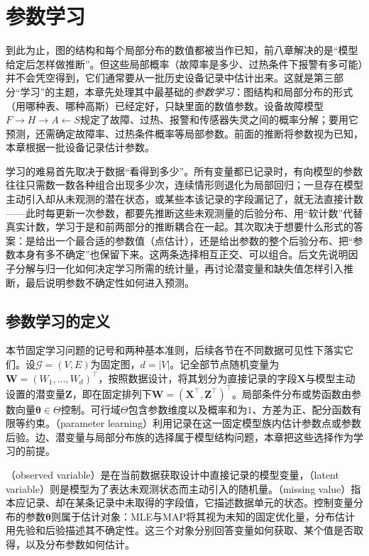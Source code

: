 \chapter{参数学习}
\label{chap:pgm-parameter-learning}

到此为止，图的结构和每个局部分布的数值都被当作已知，前八章解决的是“模型给定后怎样做推断”。但这些局部概率（故障率是多少、过热条件下报警有多可能）并不会凭空得到，它们通常要从一批历史设备记录中估计出来。这就是第三部分“学习”的主题，本章先处理其中最基础的\emph{参数学习}：图结构和局部分布的形式（用哪种表、哪种高斯）已经定好，只缺里面的数值参数。设备故障模型$F\to H\to A\leftarrow S$规定了故障、过热、报警和传感器失灵之间的概率分解；要用它预测，还需确定故障率、过热条件概率等局部参数。前面的推断将参数视为已知，本章根据一批设备记录估计参数。

学习的难易首先取决于数据“看得到多少”。所有变量都已记录时，有向模型的参数往往只需数一数各种组合出现多少次，连续情形则退化为局部回归；一旦存在模型主动引入却从未观测的潜在状态，或某些本该记录的字段漏记了，就无法直接计数——此时每更新一次参数，都要先推断这些未观测量的后验分布、用“软计数”代替真实计数，学习于是和前两部分的推断耦合在一起。其次取决于想要什么形式的答案：是给出一个最合适的参数值（点估计），还是给出参数的整个后验分布、把“参数本身有多不确定”也保留下来。这两条选择相互正交、可以组合。后文先说明因子分解与归一化如何决定学习所需的统计量，再讨论潜变量和缺失值怎样引入推断，最后说明参数不确定性如何进入预测。

\section{参数学习的定义}
\label{sec:pgm-parameter-learning-definition}

本节固定学习问题的记号和两种基本准则，后续各节在不同数据可见性下落实它们。设$\mathcal{G}=(V,E)$为固定图，$d=|V|$。记全部节点随机变量为$\bm{W}=(W_1,\ldots,W_d)^\top$，按照数据设计，将其划分为直接记录的字段$\bm{X}$与模型主动设置的潜变量$\bm{Z}$，即在固定排列下$\bm{W}=(\bm{X}^\top,\bm{Z}^\top)^\top$。局部条件分布或势函数由参数向量$\bm{\theta}\in\Theta$控制。可行域$\Theta$包含参数维度以及概率和为$1$、方差为正、配分函数有限等约束。（parameter learning）利用记录在这一固定模型族内估计参数点或参数后验。边、潜变量与局部分布族的选择属于模型结构问题，本章把这些选择作为学习的前提。

（observed variable）是在当前数据获取设计中直接记录的模型变量，（latent variable）则是模型为了表达未观测状态而主动引入的随机量。（missing value）指本应记录、却在某条记录中未取得的字段值，它描述数据单元的状态。控制变量分布的参数$\bm{\theta}$则属于估计对象：MLE与MAP将其视为未知的固定优化量，分布估计用先验和后验描述其不确定性。这三个对象分别回答变量如何获取、某个值是否取得，以及分布参数如何估计。

